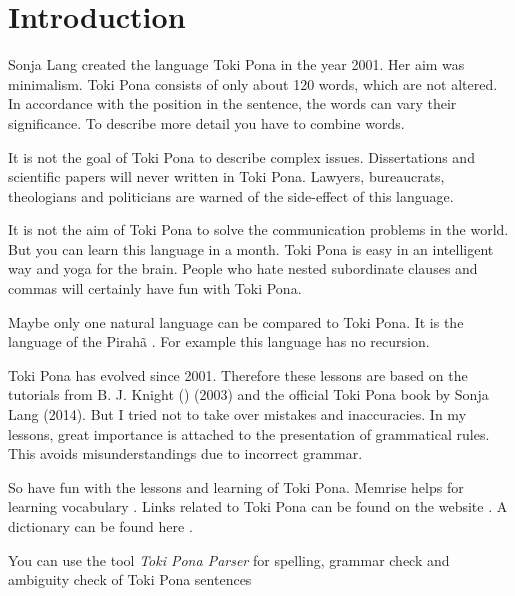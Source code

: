 
\section{Introduction}

Sonja Lang created the language Toki Pona in the year 2001.
Her aim was minimalism.
Toki Pona consists of only about 120 words, which are not altered.
In accordance with the position in the sentence, the words can vary their significance.
To describe more detail you have to combine words.

It is not the goal of Toki Pona to describe complex issues.
Dissertations and scientific papers will never written in Toki Pona.
Lawyers, bureaucrats, theologians and politicians are warned of the side-effect of this language.

It is not the aim of Toki Pona to solve the communication problems in the world.
But you can learn this language in a month.
Toki Pona is easy in an intelligent way and yoga for the brain.
People who hate nested subordinate clauses and commas will certainly have fun with Toki Pona.

Maybe only one natural language can be compared to Toki Pona.
It is the language of the Pirahã \cite{www:piraha:01}.
For example this language has no recursion.

Toki Pona has evolved since 2001.
Therefore these lessons are based on the tutorials from B. J. Knight () \cite{www:Pije:01} (2003) and the official Toki Pona book \cite{www:tokipona.org} by Sonja Lang (2014).
But I tried not to take over mistakes and inaccuracies.
In my lessons, great importance is attached to the presentation of grammatical rules.
This avoids misunderstandings due to incorrect grammar.

So have fun with the lessons and learning of Toki Pona.
Memrise helps for learning vocabulary \cite{www:memrise:01}.
Links related to Toki Pona can be found on the website \cite{www:rowa:01}.
A dictionary can be found here \cite{www:rowa:01}.

You can use the tool \textit{Toki Pona Parser} \cite{www:rowa:02} for spelling, grammar check and ambiguity check of Toki Pona sentences

